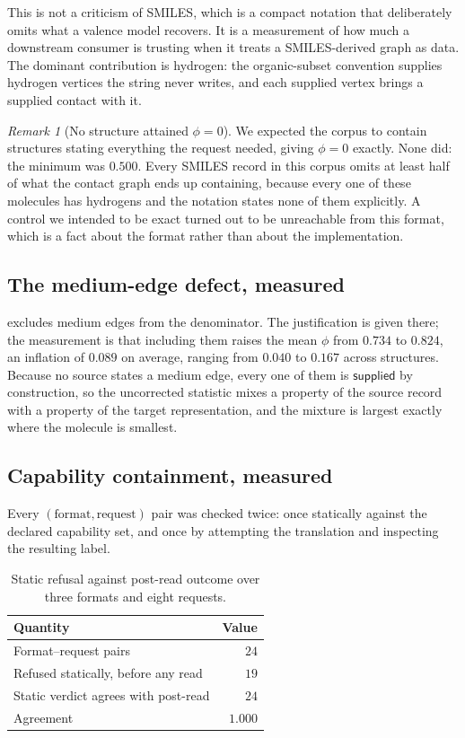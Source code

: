 \documentclass[11pt,twocolumn,a4paper]{article}
\theoremstyle{msthm}
\theoremstyle{definition}
\theoremstyle{remark}
\newtheorem{remark}[theorem]{Remark}
\newcommand{\supplied}{\textsf{supplied}}
\begin{document}
This is not a criticism of SMILES, which is a compact notation that
deliberately omits what a valence model recovers. It is a measurement of
how much a downstream consumer is trusting when it treats a
SMILES-derived graph as data. The dominant contribution is hydrogen: the
organic-subset convention supplies hydrogen vertices the string never
writes, and each supplied vertex brings a supplied contact with it.

\begin{remark}[No structure attained $\phi=0$]
\label{rem:nozero}
We expected the corpus to contain structures stating everything the
request needed, giving $\phi=0$ exactly. None did: the minimum was
$0.500$. Every SMILES record in this corpus omits at least half of what
the contact graph ends up containing, because every one of these
molecules has hydrogens and the notation states none of them explicitly.
A control we intended to be exact turned out to be unreachable from this
format, which is a fact about the format rather than about the
implementation.
\end{remark}

\subsection{The medium-edge defect, measured}
\label{sec:d2measured}

 excludes medium edges from the denominator. The
justification is given there; the measurement is that including them
raises the mean $\phi$ from $0.734$ to $0.824$, an inflation of $0.089$
on average, ranging from $0.040$ to $0.167$ across structures. Because
no source states a medium edge, every one of them is $\supplied$ by
construction, so the uncorrected statistic mixes a property of the
source record with a property of the target representation, and the
mixture is largest exactly where the molecule is smallest.

\subsection{Capability containment, measured}

Every $(\text{format},\text{request})$ pair was checked twice: once
statically against the declared capability set, and once by attempting
the translation and inspecting the resulting label.

\begin{table}[htbp]
\centering\small
\caption{Static refusal against post-read outcome over three formats and
eight requests.}
\label{tab:cap}
\begin{tabular}{@{}lr@{}}
\toprule
Quantity & Value\\
\midrule
Format--request pairs & $24$\\
Refused statically, before any read & $19$\\
Static verdict agrees with post-read & $24$\\
Agreement & $1.000$\\
\bottomrule
\end{tabular}
\end{table}
\end{document}
